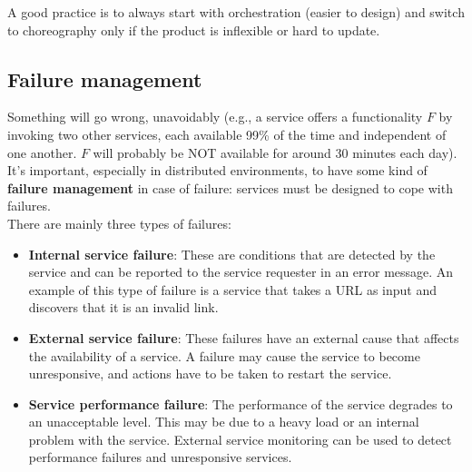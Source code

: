 A good practice is to always start with orchestration (easier to design) and switch to choreography only if the product is inflexible or hard to update.

\newpage

\subsection{Failure management}

Something will go wrong, unavoidably (e.g., a service offers a functionality \(F\) by invoking two other services, each available 99\% of the time and independent of one another. \(F\) will probably be NOT available for around 30 minutes each day). It's important, especially in distributed environments, to have some kind of \textbf{failure management} in case of failure: services must be designed to cope with failures. \\
\newline\noindent
There are mainly three types of failures:
\begin{itemize}
    \item \textbf{Internal service failure}: These are conditions that are detected by the service and can be reported to the service requester in an error message. An example of this type of failure is a service that takes a URL as input and discovers that it is an invalid link.
    \item \textbf{External service failure}: These failures have an external cause that affects the availability of a service. A failure may cause the service to become unresponsive, and actions have to be taken to restart the service.
    \item \textbf{Service performance failure}: The performance of the service degrades to an unacceptable level. This may be due to a heavy load or an internal problem with the service. External service monitoring can be used to detect performance failures and unresponsive services.
\end{itemize}

